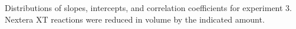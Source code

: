 Distributions of slopes, intercepts, and correlation coefficients for experiment 3.  Nextera XT reactions were reduced in volume by the indicated amount.


\label{fig:dilutions}